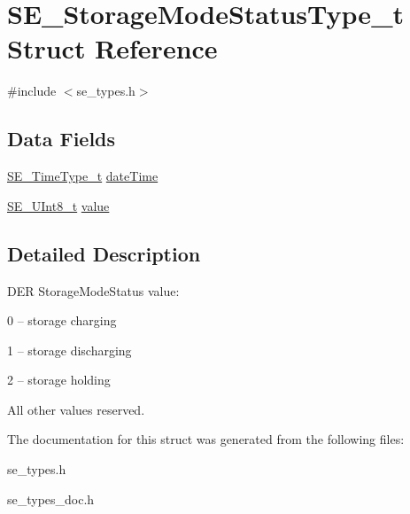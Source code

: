 \hypertarget{structSE__StorageModeStatusType__t}{}\section{S\+E\+\_\+\+Storage\+Mode\+Status\+Type\+\_\+t Struct Reference}
\label{structSE__StorageModeStatusType__t}


{\ttfamily \#include $<$se\+\_\+types.\+h$>$}

\subsection*{Data Fields}
\begin{DoxyCompactItemize}
\item 
\hyperlink{group__TimeType_ga6fba87a5b57829b4ff3f0e7638156682}{S\+E\+\_\+\+Time\+Type\+\_\+t} \hyperlink{group__StorageModeStatusType_ga1dd241e378a43cfe50b357e64ab10f6d}{date\+Time}
\item 
\hyperlink{group__UInt8_gaf7c365a1acfe204e3a67c16ed44572f5}{S\+E\+\_\+\+U\+Int8\+\_\+t} \hyperlink{group__StorageModeStatusType_ga16c64971c00e1d804890fb324568bd9a}{value}
\end{DoxyCompactItemize}


\subsection{Detailed Description}
D\+ER Storage\+Mode\+Status value\+:

0 – storage charging

1 – storage discharging

2 – storage holding

All other values reserved. 

The documentation for this struct was generated from the following files\+:\begin{DoxyCompactItemize}
\item 
se\+\_\+types.\+h\item 
se\+\_\+types\+\_\+doc.\+h\end{DoxyCompactItemize}
